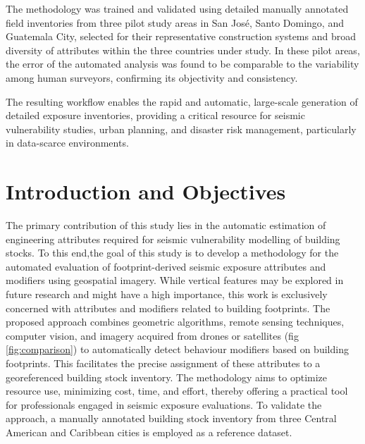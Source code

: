 \begin{refsection}
The methodology was trained and validated using detailed manually annotated field inventories from three pilot study areas in San José, Santo Domingo, and Guatemala City, selected for their representative construction systems and broad diversity of attributes within the three countries under study. In these pilot areas, the error of the automated analysis was found to be comparable to the variability among human surveyors, confirming its objectivity and consistency.

The resulting workflow enables the rapid and automatic, large-scale generation of detailed exposure inventories, providing a critical resource for seismic vulnerability studies, urban planning, and disaster risk management, particularly in data-scarce environments.

\renewcommand{\sectionnametext}{Introduction and Objectives}
\renewcommand{\headingtextR}{\thesection. \sectionnametext}
\section{\sectionnametext}


The primary contribution of this study lies in the automatic estimation of engineering attributes required for seismic vulnerability modelling of building stocks. To this end,the goal of this study is to develop a methodology for the automated evaluation of footprint-derived seismic exposure attributes and modifiers using geospatial imagery. While vertical features may be explored in future research and might have a high importance, this work is exclusively concerned with attributes and modifiers related to building footprints. The proposed approach combines geometric algorithms, remote sensing techniques, computer vision, and imagery acquired from drones or satellites (fig \ref{fig:comparison}) to automatically detect behaviour modifiers based on building footprints. This facilitates the precise assignment of these attributes to a georeferenced building stock inventory. The methodology aims to optimize resource use, minimizing cost, time, and effort, thereby offering a practical tool for professionals engaged in seismic exposure evaluations. To validate the approach, a manually annotated building stock inventory from three Central American and Caribbean cities is employed as a reference dataset. 

\begin{figure}[htbp]
    \centering
    \scriptsize

    \newlength{\imagewidth}
    \setlength{\imagewidth}{0.27\textwidth}
    \newlength{\itemwidth}
    \setlength{\itemwidth}{\dimexpr 0.47\textwidth - 0.98\imagewidth}


\end{figure}
\end{refsection}
